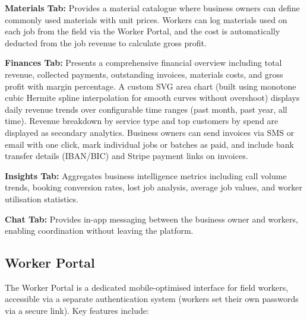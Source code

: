 \documentclass[conference]{IEEEtran}
\begin{document}
\textbf{Materials Tab:} Provides a material catalogue where business owners can define commonly used materials with unit prices. Workers can log materials used on each job from the field via the Worker Portal, and the cost is automatically deducted from the job revenue to calculate gross profit.


\textbf{Finances Tab:} Presents a comprehensive financial overview including total revenue, collected payments, outstanding invoices, materials costs, and gross profit with margin percentage. A custom SVG area chart (built using monotone cubic Hermite spline interpolation for smooth curves without overshoot) displays daily revenue trends over configurable time ranges (past month, past year, all time). Revenue breakdown by service type and top customers by spend are displayed as secondary analytics. Business owners can send invoices via SMS or email with one click, mark individual jobs or batches as paid, and include bank transfer details (IBAN/BIC) and Stripe payment links on invoices.

\textbf{Insights Tab:} Aggregates business intelligence metrics including call volume trends, booking conversion rates, lost job analysis, average job values, and worker utilisation statistics.

\textbf{Chat Tab:} Provides in-app messaging between the business owner and workers, enabling coordination without leaving the platform.

\subsection{Worker Portal}

The Worker Portal is a dedicated mobile-optimised interface for field workers, accessible via a separate authentication system (workers set their own passwords via a secure link). Key features include:
\end{document}
